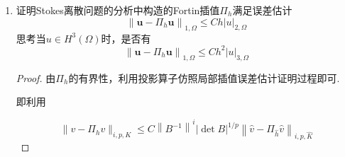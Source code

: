 \documentclass[12pt,a4paper]{article}
\begin{document}
\begin{enumerate}
\begin{enumerate}
			\begin{proof}
				通过尺度变换技巧变换到参考单元：
				$$|\Pi_{h}^2{v}|_{1,K}=|\widehat{\Pi_{h}^2{v}}|_{1,\hat{K}}\leq C||\hat{v}||_{1,\hat{K}}\leq C(h_{K}^{-1}|{v}|_{0,K}+|{v}|_{1,K}).$$
				再利用逆估计得到结果.
			\end{proof}
			
			\item $b(\Pi_h^2\mathbf{v},q_h)=b(\mathbf{v},q_h),\:\forall q_h\in Q_h$
			
			\begin{proof}
				由$\Pi_h^2 v$的定义有
				\begin{equation*}
					\begin{aligned}
						&\int_e (v-\Pi_h v) \cdot \nu q_h ds=0, \quad \forall e \in \partial K \\
						\Rightarrow & \int_{\partial K} (v-\Pi_h v) \cdot \nu q_h ds=0 \\
						\Rightarrow & \int_K \mathrm{div}(v-\Pi_{h}v) q_h dx = 0, \quad \forall K \subset \Gamma_h \\
						\Rightarrow & \int_{\Omega} \mathrm{div}(v-\Pi_{h}v) q_h dx = 0 \\
						\Rightarrow & b(v-\Pi_{h}v,q_h) = 0		
					\end{aligned}
				\end{equation*}
				
			\end{proof}
		\end{enumerate}
	
		\item 证明Stokes离散问题的分析中构造的Fortin插值$\Pi_h$满足误差估计
		$$\left\|\mathbf{u}-\Pi_h\mathbf{u}\right\|_{1,\Omega}\leq Ch\left|u\right|_{2,\Omega}$$
		思考当$u\in H^3(\Omega)$时，是否有
		$$\left\|\mathbf{u}-\Pi_h\mathbf{u}\right\|_{1,\Omega}\leq Ch^2\left|u\right|_{3,\Omega}$$
		
		\begin{proof}
			由$\Pi_h$的有界性，利用投影算子仿照局部插值误差估计证明过程即可.
			
			即利用
			
			$$\|v-\Pi_h v\|_{i,p,K}\leq C\left\|B^{-1}\right\|^i|\det B|^{1/p}\left\|\widehat{v}-\Pi_{\widehat{h}}\widehat{v}\right\|_{i,p,\widehat{K}}$$
			

\end{proof}
\end{enumerate}
\end{document}
